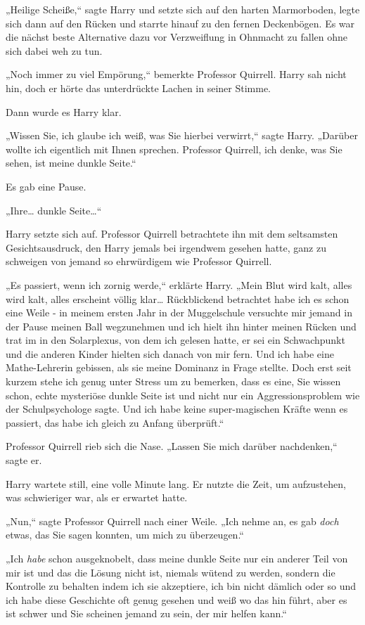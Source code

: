 {„Heilige Scheiße,“ sagte Harry und setzte sich auf den harten Marmorboden, legte sich dann auf den Rücken und starrte hinauf zu den fernen Deckenbögen. Es war die nächst beste Alternative dazu vor Verzweiflung in Ohnmacht zu fallen ohne sich dabei weh zu tun.

„Noch immer zu viel Empörung,“ bemerkte Professor Quirrell. Harry sah nicht hin, doch er hörte das unterdrückte Lachen in seiner Stimme.

Dann wurde es Harry klar.

„Wissen Sie, ich glaube ich weiß, was Sie hierbei verwirrt,“ sagte Harry. „Darüber wollte ich eigentlich mit Ihnen sprechen. Professor Quirrell, ich denke, was Sie sehen, ist meine dunkle Seite.“

Es gab eine Pause.

„Ihre… dunkle Seite…“

Harry setzte sich auf. Professor Quirrell betrachtete ihn mit dem seltsamsten Gesichtsausdruck, den Harry jemals bei irgendwem gesehen hatte, ganz zu schweigen von jemand so ehrwürdigem wie Professor Quirrell.

„Es passiert, wenn ich zornig werde,“ erklärte Harry. „Mein Blut wird kalt, alles wird kalt, alles erscheint völlig klar… Rückblickend betrachtet habe ich es schon eine Weile - in meinem ersten Jahr in der Muggelschule versuchte mir jemand in der Pause meinen Ball wegzunehmen und ich hielt ihn hinter meinen Rücken und trat im in den Solarplexus, von dem ich gelesen hatte, er sei ein Schwachpunkt und die anderen Kinder hielten sich danach von mir fern. Und ich habe eine Mathe-Lehrerin gebissen, als sie meine Dominanz in Frage stellte. Doch erst seit kurzem stehe ich genug unter Stress um zu bemerken, dass es eine, Sie wissen schon, echte mysteriöse dunkle Seite ist und nicht nur ein Aggressionsproblem wie der Schulpsychologe sagte. Und ich habe keine super-magischen Kräfte wenn es passiert, das habe ich gleich zu Anfang überprüft.“

Professor Quirrell rieb sich die Nase. „Lassen Sie mich darüber nachdenken,“ sagte er.

Harry wartete still, eine volle Minute lang. Er nutzte die Zeit, um aufzustehen, was schwieriger war, als er erwartet hatte.

„Nun,“ sagte Professor Quirrell nach einer Weile. „Ich nehme an, es gab \emph{doch} etwas, das Sie sagen konnten, um mich zu überzeugen.“

„Ich \emph{habe} schon ausgeknobelt, dass meine dunkle Seite nur ein anderer Teil von mir ist und das die Lösung nicht ist, niemals wütend zu werden, sondern die Kontrolle zu behalten indem ich sie akzeptiere, ich bin nicht dämlich oder so und ich habe diese Geschichte oft genug gesehen und weiß wo das hin führt, aber es ist schwer und Sie scheinen jemand zu sein, der mir helfen kann.“

}
